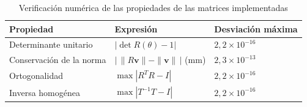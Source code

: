 \begin{table}[htbp]
\caption{Verificación numérica de las propiedades de las matrices implementadas}
\label{tab:propiedades}
\begin{tabular}{lll}
\toprule
Propiedad & Expresión & Desviación máxima \\
\midrule
Determinante unitario & $|\det R(\theta) - 1|$ & $2{,}2 \times 10^{-16}$ \\
Conservación de la norma & $\bigl|\,\|R\mathbf{v}\| - \|\mathbf{v}\|\,\bigr|$ (mm) & $2{,}3 \times 10^{-13}$ \\
Ortogonalidad & $\max |R^{T}R - I|$ & $2{,}2 \times 10^{-16}$ \\
Inversa homogénea & $\max |T^{-1}T - I|$ & $2{,}2 \times 10^{-16}$ \\
\bottomrule
\end{tabular}
\end{table}
